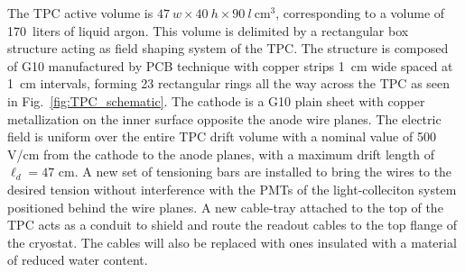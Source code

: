 \documentclass[DIV=calc, paper=a4, fontsize=10pt, twocolumn]{scrartcl}	 %
\begin{document}
{The TPC active volume is  $47~w\times 40~h\times 90~l~$cm$^{3}$, corresponding to a volume of 170~liters of liquid argon. This volume is delimited by a rectangular box structure acting as field shaping system of the TPC. The structure is composed of G10 manufactured by PCB technique with copper strips 1~cm wide spaced at 1~cm intervals, forming 23 rectangular rings all the way across the TPC as seen in Fig.~\ref{fig:TPC_schematic}. The cathode is a G10 plain sheet with copper metallization on the inner surface opposite the anode wire planes. The electric field is uniform over the entire TPC drift volume with a nominal value of 500 V/cm from the cathode to the anode planes, with a maximum drift length of $\ell_d=47$ cm. A new set of tensioning bars are installed to bring the wires to the desired tension without  interference with the PMTs of the light-colleciton system positioned behind the wire planes. A new cable-tray attached to the top of the TPC acts as a conduit to shield and route the readout cables to the top flange of the cryostat. The cables will also be replaced with ones insulated with a material of reduced water content. 


}
\end{document}
